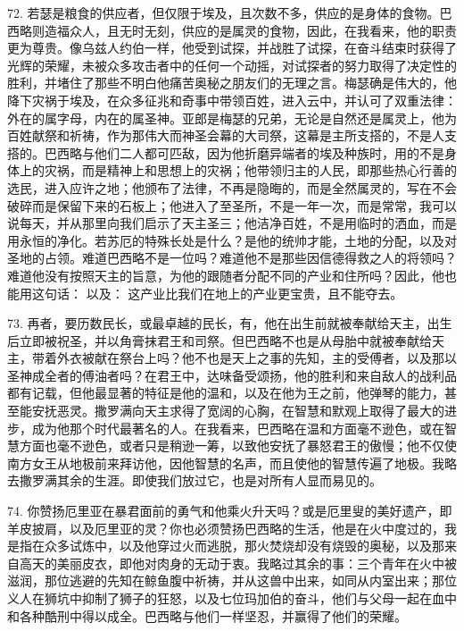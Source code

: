 72. 若瑟是粮食的供应者，但仅限于埃及，且次数不多，供应的是身体的食物。巴西略则造福众人，且无时无刻，供应的是属灵的食物，因此，在我看来，他的职责更为尊贵。像乌兹人约伯一样，他受到试探，并战胜了试探，在奋斗结束时获得了光辉的荣耀，未被众多攻击者中的任何一个动摇，对试探者的努力取得了决定性的胜利，并堵住了那些不明白他痛苦奥秘之朋友们的无理之言。梅瑟确是伟大的，他降下灾祸于埃及，在众多征兆和奇事中带领百姓，进入云中，并认可了双重法律：外在的属字母，内在的属圣神。亚郎是梅瑟的兄弟，无论是自然还是属灵上，他为百姓献祭和祈祷，作为那伟大而神圣会幕的大司祭，这幕是主所支搭的，不是人支搭的。巴西略与他们二人都可匹敌，因为他折磨异端者的埃及种族时，用的不是身体上的灾祸，而是精神上和思想上的灾祸；他带领归主的人民，即那些热心行善的选民，进入应许之地；他颁布了法律，不再是隐晦的，而是全然属灵的，写在不会破碎而是保留下来的石板上；他进入了至圣所，不是一年一次，而是常常，我可以说每天，并从那里向我们启示了天主圣三；他洁净百姓，不是用临时的洒血，而是用永恒的净化。若苏厄的特殊长处是什么？是他的统帅才能，土地的分配，以及对圣地的占领。难道巴西略不是一位吗？难道他不是那些因信德得救之人的将领吗？难道他没有按照天主的旨意，为他的跟随者分配不同的产业和住所吗？因此，他也能用这句话： 以及： 这产业比我们在地上的产业更宝贵，且不能夺去。\par

73. 再者，要历数民长，或最卓越的民长，有，他在出生前就被奉献给天主，出生后立即被祝圣，并以角膏抹君王和司祭。但巴西略不也是从母胎中就被奉献给天主，带着外衣被献在祭台上吗？他不也是天上之事的先知，主的受傅者，以及那以圣神成全者的傅油者吗？在君王中，达味备受颂扬，他的胜利和来自敌人的战利品都有记载，但他最显著的特征是他的温和，以及在他为王之前，他弹琴的能力，甚至能安抚恶灵。撒罗满向天主求得了宽阔的心胸，在智慧和默观上取得了最大的进步，成为他那个时代最著名的人。在我看来，巴西略在温和方面毫不逊色，或在智慧方面也毫不逊色，或者只是稍逊一筹，以致他安抚了暴怒君王的傲慢；他不仅使南方女王从地极前来拜访他，因他智慧的名声，而且使他的智慧传遍了地极。我略去撒罗满其余的生涯。即使我们放过它，也是对所有人显而易见的。\par

74. 你赞扬厄里亚在暴君面前的勇气和他乘火升天吗？或是厄里叟的美好遗产，即羊皮披肩，以及厄里亚的灵？你也必须赞扬巴西略的生活，他是在火中度过的，我是指在众多试炼中，以及他穿过火而逃脱，那火焚烧却没有烧毁的奥秘，以及那来自高天的美丽皮衣，即他对肉身的无动于衷。我略过其余的事：三个青年在火中被滋润，那位逃避的先知在鲸鱼腹中祈祷，并从这兽中出来，如同从内室出来；那位义人在狮坑中抑制了狮子的狂怒，以及七位玛加伯的奋斗，他们与父母一起在血中和各种酷刑中得以成全。巴西略与他们一样坚忍，并赢得了他们的荣耀。\par

